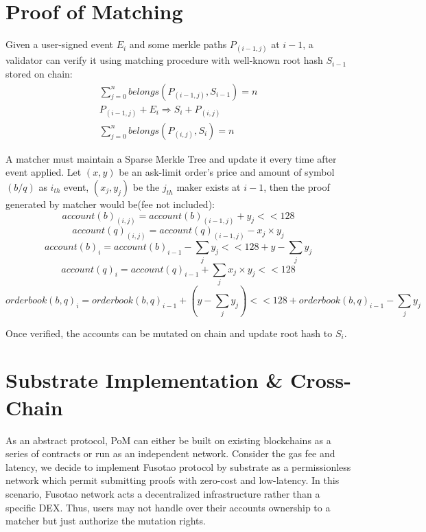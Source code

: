 \documentclass[a4paper,12pt]{article}
\begin{document}
\section{Proof of Matching}
\label{sec:orgd522d7b}
Given a user-signed event \(E_{i}\) and some merkle paths \(P_{(i-1, j)}\) at \(i-1\), a validator can verify it using matching procedure with well-known root hash \(S_{i-1}\) stored on chain:
\begin{eqnarray*}
\sum\limits_{j=0}^{n} belongs(P_{(i-1, j)}, S_{i-1}) = n\\
P_{(i-1, j)} + E_{i} \Rightarrow S_{i} + P_{(i, j)} \\
\sum\limits_{j=0}^{n} belongs(P_{(i, j)}, S_{i}) = n
\end{eqnarray*}

A matcher must maintain a Sparse Merkle Tree and update it every time after event applied. Let \((x, y)\) be an ask-limit order's price and amount of symbol \((b/q)\) as \(i_{th}\) event, \((x_{j}, y_{j})\) be the \(j_{th}\) maker exists at \(i-1\), then the proof generated by matcher would be(fee not included):
\begin{equation*}
    account(b)_{(i, j)}=account(b)_{(i-1,j)} + y_{j} << 128
\end{equation*}
\begin{equation*}
    account(q)_{(i, j)}=account(q)_{(i-1,j)} - x_{j} \times y_{j}
\end{equation*}
\begin{equation*}
    account(b)_{i}=account(b)_{i-1} - \sum\limits_{j} y_{j} << 128 + y - \sum\limits_{j} y_{j}
\end{equation*}
\begin{equation*}
    account(q)_{i}=account(q)_{i-1} + \sum\limits_{j} x_{j} \times y_{j} << 128
\end{equation*}
\begin{equation*}
    orderbook(b,q)_{i}=orderbook(b,q)_{i-1} + (y - \sum\limits_{j} y_{j}) << 128 + orderbook(b,q)_{i-1} - \sum\limits_{j} y_{j}
\end{equation*}

Once verified, the accounts can be mutated on chain and update root hash to \(S_{i}\).
\section{Substrate Implementation \& Cross-Chain}
\label{sec:org991c934}
As an abstract protocol, PoM can either be built on existing blockchains as a series of contracts or run as an independent network. Consider the gas fee and latency, we decide to implement Fusotao protocol by substrate as a permissionless network which permit submitting proofs with zero-cost and low-latency. In this scenario, Fusotao network acts a decentralized infrastructure rather than a specific DEX. Thus, users may not handle over their accounts ownership to a matcher but just authorize the mutation rights.
\end{document}
